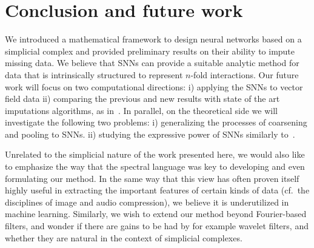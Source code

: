 \section{Conclusion and future work}

We introduced a mathematical framework to design neural networks based on a simplicial complex and provided preliminary results on their ability to impute missing data.
We believe that SNNs can provide a suitable analytic method for data that is intrinsically structured to represent $n$-fold interactions.
Our future work will focus on two computational directions:  i) applying the SNNs to vector field data ii) comparing the previous and new results with state of the art imputations algorithms, as in~\cite{spinelli2020neural}.
In parallel, on the theoretical side we will investigate the following two problems: i) generalizing the processes of coarsening and pooling to SNNs. ii) studying the expressive power of SNNs similarly to~\cite{morris2019weisfeiler}. 

Unrelated to the simplicial nature of the work presented here, we would also like to emphasize the way that the spectral language was key to developing and even formulating our method. In the same way that this view has often proven itself highly useful in extracting the important features of certain kinds of data (cf.\ the disciplines of image and audio compression), we believe it is underutilized in machine learning.
Similarly, we wish to extend our method beyond Fourier-based filters, and wonder if there are gains to be had by for example wavelet filters, and whether they are natural in the context of simplicial complexes.
